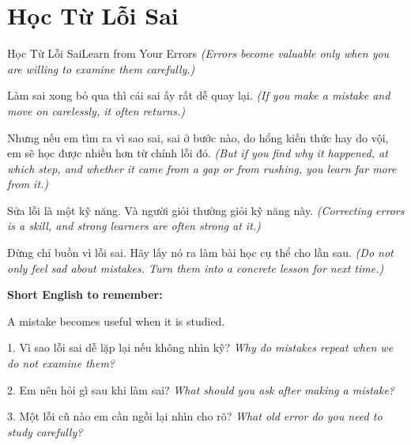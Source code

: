 \section{Học Từ Lỗi Sai}
\begin{truyen}{Học Từ Lỗi Sai}{Learn from Your Errors}
\textit{(Errors become valuable only when you are willing to examine them carefully.)}

Làm sai xong bỏ qua thì cái sai ấy rất dễ quay lại.
\textit{(If you make a mistake and move on carelessly, it often returns.)}

Nhưng nếu em tìm ra vì sao sai, sai ở bước nào, do hổng kiến thức hay do vội, em sẽ học được nhiều hơn từ chính lỗi đó.
\textit{(But if you find why it happened, at which step, and whether it came from a gap or from rushing, you learn far more from it.)}

Sửa lỗi là một kỹ năng. Và người giỏi thường giỏi kỹ năng này.
\textit{(Correcting errors is a skill, and strong learners are often strong at it.)}
\end{truyen}

\begin{baihoc}
Đừng chỉ buồn vì lỗi sai. Hãy lấy nó ra làm bài học cụ thể cho lần sau.
\textit{(Do not only feel sad about mistakes. Turn them into a concrete lesson for next time.)}
\end{baihoc}

\begin{ghinhoanh}
\textbf{Short English to remember:}

A mistake becomes useful when it is studied.

\end{ghinhoanh}

\begin{tuhocnhanh}
1. Vì sao lỗi sai dễ lặp lại nếu không nhìn kỹ? \textit{Why do mistakes repeat when we do not examine them?}

2. Em nên hỏi gì sau khi làm sai? \textit{What should you ask after making a mistake?}

3. Một lỗi cũ nào em cần ngồi lại nhìn cho rõ? \textit{What old error do you need to study carefully?}
\end{tuhocnhanh}
\ngancach

